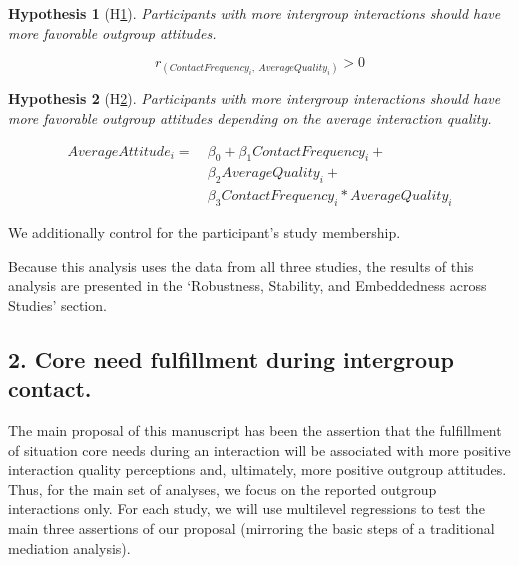 \documentclass[man, 12pt, a4paper, mask]{apa7}
\theoremstyle{break}
\theoremstyle{plain}
\newtheorem{subhyp}{Hypothesis}
\begin{document}
\begin{mdframed}[style=mdfhypothesis]
    \begin{subhyp}[H\ref{hyp:contactCor}] \label{hyp:contactCor}
    \addtolength{\leftskip}{\subhypskip}
    Participants with more intergroup interactions should have more favorable outgroup attitudes.
    \end{subhyp}

      \begin{fleqn}[\eqskip] 
        \begin{equation} \label{eq:ContactCor}
            r_{\left(ContactFrequency_{i},\ AverageQuality_{i}\right)} > 0
        \end{equation}
      \end{fleqn}

    \begin{subhyp}[H\ref{hyp:contactQualLM}] \label{hyp:contactQualLM}
    \addtolength{\leftskip}{\subhypskip}
    Participants with more intergroup interactions should have more favorable outgroup attitudes depending on the average interaction quality.
    \end{subhyp}

      \begin{fleqn}[\eqskip] 
        \begin{equation} \label{eq:contactQualLM}
            \begin{split}
              AverageAttitude_{i} = &\ \beta_{0} + \beta_{1}ContactFrequency_{i} + \\
                                    &\ \beta_{2}AverageQuality_{i} +\\
                                    &\ \beta_{3}ContactFrequency_{i} * AverageQuality_{i}
            \end{split}
        \end{equation}
      \end{fleqn}  
      
      We additionally control for the participant's study membership.
\end{mdframed}
Because this analysis uses the data from all three studies, the results of this analysis are presented in the `Robustness, Stability, and Embeddedness across Studies' section.

\subsection{2. Core need fulfillment during intergroup contact.}
The main proposal of this manuscript has been the assertion that the fulfillment of situation core needs during an interaction will be associated with more positive interaction quality perceptions and, ultimately, more positive outgroup attitudes. Thus, for the main set of analyses, we focus on the reported outgroup interactions only. For each study, we will use multilevel regressions to test the main three assertions of our proposal (mirroring the basic steps of a traditional mediation analysis).
\end{document}
